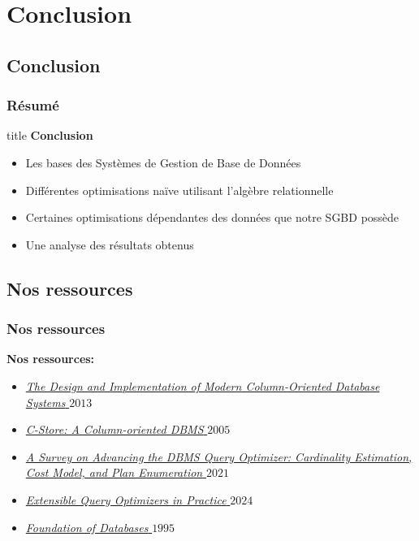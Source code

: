 \documentclass[a4paper,12pt]{beamer}
\begin{document}
\section{Conclusion}
\subsection{Conclusion}
\begin{frame}
    \frametitle{Résumé}
    \vspace{0.3cm}

    \begin{beamercolorbox}[
        wd=\textwidth,
        rounded=true,
        shadow=true,
        sep=10pt,
        center
    ]{title}
        {\Huge\bfseries Conclusion}
    \end{beamercolorbox}

    \vspace{0.6cm}

    \begin{itemize}
        \item Les bases des Systèmes de Gestion de Base de Données
        \item Différentes optimisations naïve utilisant l'algèbre relationnelle
        \item Certaines optimisations dépendantes des données que notre SGBD possède
        \item Une analyse des résultats obtenus
    \end{itemize}
\end{frame}

\subsection{Nos ressources}
\begin{frame}
    \frametitle{Nos ressources}
    \textbf{Nos ressources:}
    \begin{itemize}
        \item \href{https://drive.google.com/file/d/1KNmuRBf8CV-s-zqdkUEP8iyYlPgFiglb/view?usp=drive_link}{\textit{The Design and Implementation of Modern Column-Oriented Database Systems} \(2013\)}
        \item \href{https://web.stanford.edu/class/cs345d-01/rl/cstore.pdf}{\textit{C-Store: A Column-oriented DBMS} \(2005\)}
        \item \href{https://link.springer.com/content/pdf/10.1007/s41019-020-00149-7.pdf}{\textit{A Survey on Advancing the DBMS Query Optimizer: Cardinality Estimation, Cost Model, and Plan Enumeration} \(2021\)}
        \item \href{https://www.microsoft.com/en-us/research/wp-content/uploads/2024/12/Extensible-Query-Optimizers-in-Practice.pdf}{\textit{Extensible Query Optimizers in Practice} \(2024\)}
        \item \href{http://webdam.inria.fr/Alice/}{\textit{Foundation of Databases} \(1995\)}
    \end{itemize}
\end{frame}
\end{document}
